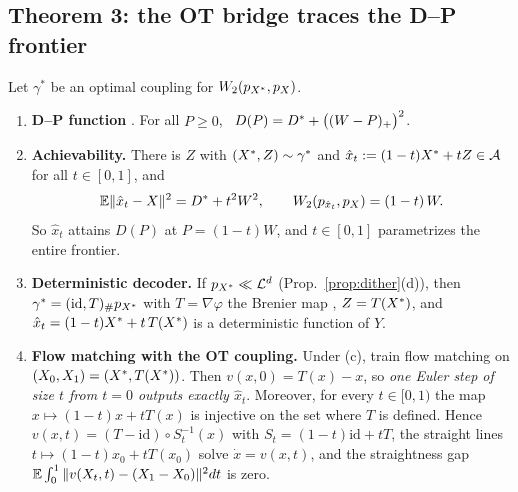 \subsection{Theorem 3: the OT bridge traces the D--P frontier}

\begin{theorem}[OT bridge]\label{thm:ot-bridge}
Let $\gamma^*$ be an optimal coupling for $W_2(p_{X^{*}},p_X)$.
\begin{enumerate}
  \item[(a)] \textbf{D--P function} \cite{freirich2021theory}. For all $P\ge0$, \ $D(P)=D^{*}+\bigl((W-P)_+\bigr)^2$.
  \item[(b)] \textbf{Achievability.} There is $Z$ with $(X^{*},Z)\sim\gamma^*$ and $\hat x_t:=(1-t)X^{*}+tZ\in\mathcal{A}$ for all $t\in[0,1]$, and
  \begin{equation}\label{eq:geodesic}
    \mathbb{E}\|\hat x_t-X\|^2=D^{*}+t^2W^2,\qquad W_2(p_{\hat x_t},p_X)=(1-t)\,W .
  \end{equation}
  So $\hat x_t$ attains $D(P)$ at $P=(1-t)W$, and $t\in[0,1]$ parametrizes the entire frontier.
  \item[(c)] \textbf{Deterministic decoder.} If $p_{X^{*}}\ll\mathcal{L}^d$ (Prop.~\ref{prop:dither}(d)), then $\gamma^*=(\mathrm{id},T)_\#p_{X^{*}}$ with $T=\nabla\varphi$ the Brenier map \cite{brenier1991polar}, $Z=T(X^{*})$, and $\hat x_t=(1-t)X^{*}+t\,T(X^{*})$ is a deterministic function of $Y$.
  \item[(d)] \textbf{Flow matching with the OT coupling.} Under (c), train flow matching on $(X_0,X_1)=(X^{*},T(X^{*}))$. Then $v(x,0)=T(x)-x$, so \emph{one Euler step of size $t$ from $t=0$ outputs exactly $\hat x_t$}. Moreover, for every $t\in[0,1)$ the map $x\mapsto(1-t)x+tT(x)$ is injective on the set where $T$ is defined. Hence $v(x,t)=(T-\mathrm{id})\circ S_t^{-1}(x)$ with $S_t=(1-t)\mathrm{id}+tT$, the straight lines $t\mapsto(1-t)x_0+tT(x_0)$ solve $\dot x=v(x,t)$, and the straightness gap $\mathbb{E}\int_0^1\|v(X_t,t)-(X_1-X_0)\|^2dt$ is zero.
\end{enumerate}
\end{theorem}

